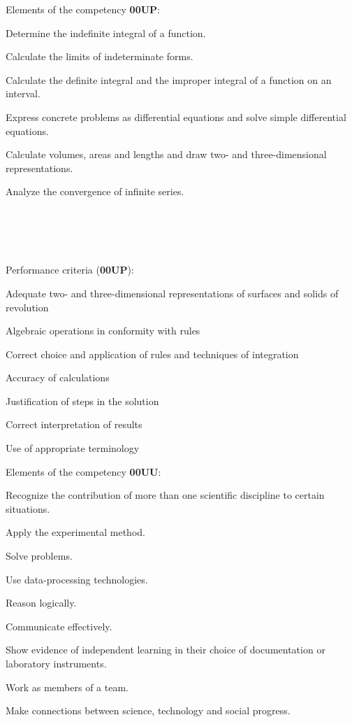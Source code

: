 \documentclass[10pt]{article}
\begin{document}
\begin{multicols}{2}
Elements of the competency \textbf{00UP}:
\begin{compactenum}
\item Determine the indefinite integral of a function.
\item Calculate the limits of indeterminate forms.
\item Calculate the definite integral and the improper integral of a function on an interval.
\item Express concrete problems as differential equations and solve simple differential equations.
\item Calculate volumes, areas and lengths and draw
two- and three-dimensional representations.
\item Analyze the convergence of infinite series. \\ \\ \\ \\ \\
\end{compactenum}

Performance criteria (\textbf{00UP}):
\begin{compactitem}
\item Adequate two- and three-dimensional representations of surfaces and solids of revolution
\item Algebraic operations in conformity with rules
\item Correct choice and application of rules and techniques of integration
\item Accuracy of calculations
\item Justification of steps in the solution
\item Correct interpretation of results \item Use of appropriate terminology
\end{compactitem}

\vfill
\columnbreak

Elements of the competency \textbf{00UU}:
\begin{compactenum}
\item Recognize the contribution of more than one
scientific discipline to certain situations.
\item Apply the experimental method.
\item Solve problems.
\item Use data-processing technologies.
\item Reason logically.
\item Communicate effectively.
\item Show evidence of independent learning in their choice of documentation or laboratory instruments.
\item Work as members of a team.
\item Make connections between science, technology and social progress. \\
\end{compactenum}


\end{multicols}
\end{document}
